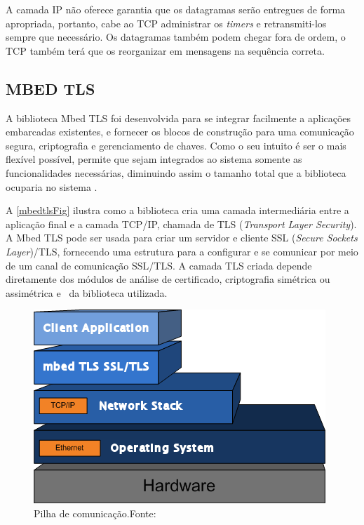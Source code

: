 A camada IP não oferece garantia que os datagramas serão entregues de forma apropriada, portanto, cabe ao TCP administrar os \textit{timers} e retransmiti-los sempre que necessário. Os datagramas também podem chegar fora de ordem, o TCP também terá que os reorganizar em mensagens na sequência correta. 

\subsection{MBED TLS}
A biblioteca Mbed TLS foi desenvolvida para se integrar facilmente a aplicações embarcadas existentes, e fornecer os blocos de construção para uma comunicação segura, criptografia e gerenciamento de chaves. Como o seu intuito é ser o mais flexível possível, permite que sejam integrados ao sistema somente as funcionalidades necessárias, diminuindo assim o tamanho total que a biblioteca ocuparia no sistema \cite{mbedtls}.

A \autoref{mbedtlsFig} ilustra como a biblioteca cria uma camada intermediária entre a aplicação final e a camada TCP/IP, chamada de TLS (\textit{Transport Layer Security}). A Mbed TLS pode ser usada para criar um servidor e cliente SSL (\textit{Secure Sockets Layer})/TLS, fornecendo uma estrutura para a configurar e se comunicar por meio de um canal de comunicação SSL/TLS. A camada TLS criada depende diretamente dos módulos de análise de certificado, criptografia simétrica ou assimétrica e \hash\ da biblioteca utilizada.

\begin{figure}[H]
    \scriptsize
     \centering
     \includegraphics[scale=1]{dados/figuras/mbedtls.png}
     \caption{Pilha de comunicação.\newline Fonte:\cite{mbedtls}}
     \label{mbedtlsFig}
\end{figure}

